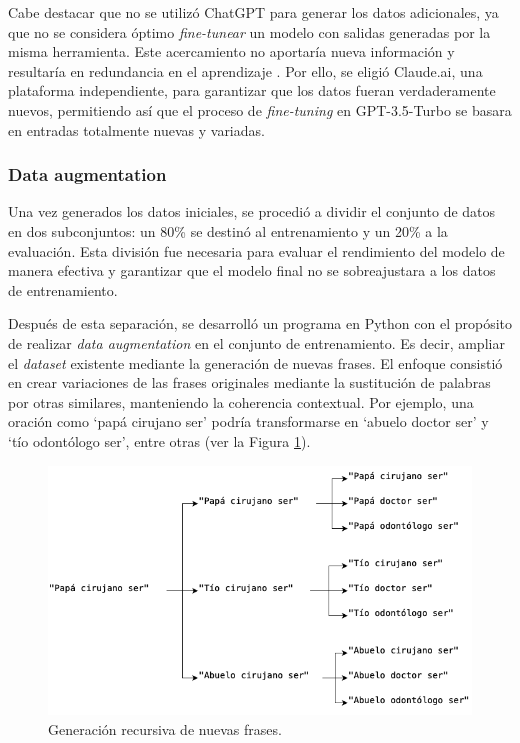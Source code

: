 Cabe destacar que no se utilizó ChatGPT para generar los datos adicionales, ya que no se considera óptimo \textit{fine-tunear} un modelo con salidas generadas por la misma herramienta. Este acercamiento no aportaría nueva información y resultaría en redundancia en el aprendizaje \cite{thirtyeight}. Por ello, se eligió Claude.ai, una plataforma independiente, para garantizar que los datos fueran verdaderamente nuevos, permitiendo así que el proceso de \textit{fine-tuning} en GPT-3.5-Turbo se basara en entradas totalmente nuevas y variadas.


\subsubsection{Data augmentation}

Una vez generados los datos iniciales, se procedió a dividir el conjunto de datos en dos subconjuntos: un 80\% se destinó al entrenamiento y un 20\% a la evaluación. Esta división fue necesaria para evaluar el rendimiento del modelo de manera efectiva y garantizar que el modelo final no se sobreajustara a los datos de entrenamiento.

Después de esta separación, se desarrolló un programa en Python con el propósito de realizar \textit{data augmentation} en el conjunto de entrenamiento. Es decir, ampliar el \textit{dataset} existente mediante la generación de nuevas frases. El enfoque consistió en crear variaciones de las frases originales mediante la sustitución de palabras por otras similares, manteniendo la coherencia contextual. Por ejemplo, una oración como ‘papá cirujano ser’ podría transformarse en ‘abuelo doctor ser’ y ‘tío odontólogo ser’, entre otras (ver la Figura \ref{fig:RECUR}).

\begin{figure}[H]
  \centering
  \includegraphics[width=0.9\linewidth]{figuras/RECUR.png}
  \caption{Generación recursiva de nuevas frases.}
  \label{fig:RECUR}
\end{figure}

